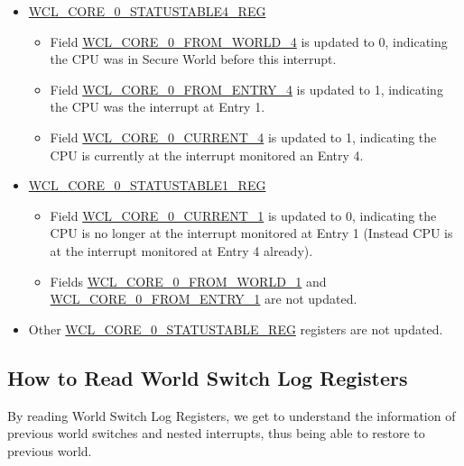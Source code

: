 \documentclass[main\_\_EN.tex]{subfiles}
\begin{document}
\begin{enumerate}
\begin{itemize}
        \item \hyperref[regdesc:WCLCORE0STATUSTABLE0REG]{WCL\_CORE\_0\_STATUSTABLE4\_REG}
        \begin{itemize}
            \item Field \hyperref[fielddesc:WCLCORE0FROMWORLD0]{WCL\_CORE\_0\_FROM\_WORLD\_4} is updated to 0, indicating the CPU was in Secure World before this interrupt.
            \item Field \hyperref[fielddesc:WCLCORE0FROMENTRY0]{WCL\_CORE\_0\_FROM\_ENTRY\_4} is updated to 1, indicating the CPU was the interrupt at Entry 1.
            \item Field \hyperref[fielddesc:WCLCORE0CURRENT0]{WCL\_CORE\_0\_CURRENT\_4} is updated to 1, indicating the CPU is currently at the interrupt monitored an Entry 4.
        \end{itemize}
        \item \hyperref[regdesc:WCLCORE0STATUSTABLE0REG]{WCL\_CORE\_0\_STATUSTABLE1\_REG}
        \begin{itemize}
            \item Field \hyperref[fielddesc:WCLCORE0CURRENT0]{WCL\_CORE\_0\_CURRENT\_1} is updated to 0, indicating the CPU is no longer at the interrupt monitored at Entry 1 (Instead CPU is at the interrupt monitored at Entry 4 already).
            \item Fields \hyperref[fielddesc:WCLCORE0FROMWORLD0]{WCL\_CORE\_0\_FROM\_WORLD\_1} and \hyperref[fielddesc:WCLCORE0FROMENTRY0]{WCL\_CORE\_0\_FROM\_ENTRY\_1} are not updated.
        \end{itemize}
        \item Other \hyperref[regdesc:WCLCORE0STATUSTABLE0REG]{WCL\_CORE\_0\_STATUSTABLE\_REG} registers are not updated.
\end{itemize}
\end{enumerate}

\subsection{How to Read World Switch Log Registers} \label{sec:wctrl-read-table}

By reading World Switch Log Registers, we get to understand the information of previous world switches and nested interrupts, thus being able to restore to previous world.
\end{document}
